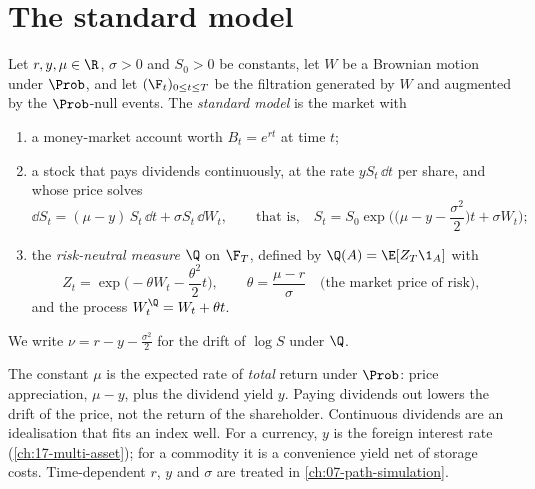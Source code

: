 \section{The standard model}\label{sec:sm-model}

\begin{definition}\label{def:sm-model}
Let $r,y,\mu\in\R$, $\sigma>0$ and $S_0>0$ be constants, let $W$ be a Brownian motion under $\Prob$,
and let $(\F_t)_{0\le t\le T}$ be the filtration generated by $W$ and augmented by the
$\Prob$-null events. The \emph{standard model} is the market with
\begin{enumerate}[label=(\roman*)]
  \item a money-market account worth $B_t=e^{rt}$ at time $t$;
  \item a stock that pays dividends continuously, at the rate $yS_t\,\dd t$ per share, and
    whose price solves
    \begin{equation}\label{eq:sm-P}
      \dd S_t=(\mu-y)\,S_t\,\dd t+\sigma S_t\,\dd W_t,\qquad
      \text{that is,}\quad S_t=S_0\exp\Big(\Big(\mu-y-\frac{\sigma^2}{2}\Big)t+\sigma W_t\Big);
    \end{equation}
  \item the \emph{risk-neutral measure} $\Q$ on $\F_T$, defined by $\Q(A)=\E[Z_T\1_A]$ with
    \[
      Z_t=\exp\Big(-\theta W_t-\frac{\theta^2}{2}t\Big),\qquad
      \theta=\frac{\mu-r}{\sigma}\quad\text{(the market price of risk)},
    \]
    and the process $W^\Q_t=W_t+\theta t$.
\end{enumerate}
We write $\nu=r-y-\frac{\sigma^2}{2}$ for the drift of $\log S$ under $\Q$.
\end{definition}

The constant $\mu$ is the expected rate of \emph{total} return under $\Prob$: price
appreciation, $\mu-y$, plus the dividend yield $y$. Paying dividends out lowers the drift of
the price, not the return of the shareholder. Continuous dividends are an idealisation that fits
an index well. For a currency, $y$ is the foreign interest rate (\cref{ch:17-multi-asset}); for a
commodity it is a convenience yield net of storage costs. Time-dependent $r$, $y$ and $\sigma$ are
treated in \cref{ch:07-path-simulation}.

